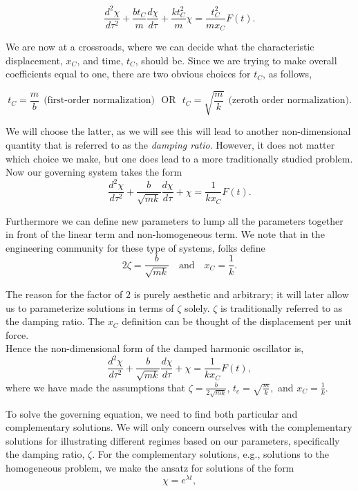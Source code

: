 $$ \frac{d^2 \chi}{d\tau^2} + \frac{b t_C}{m} \frac{d\chi}{d\tau} + \frac{kt_C^2}{m} \chi = \frac{t_C^2}{m x_C} F(t).$$

We are now at a crossroads, where we can decide what the characteristic displacement, $x_C$, and time, $t_C$, should be. Since we are trying to make overall coefficients equal to one, there are two obvious choices for $t_C$, as follows, 

$$t_C = \frac{m}{b} \ \ \mbox{(first-order normalization)} \ \ \ \mbox{OR} \ \ \ t_C = \sqrt{ \frac{m}{k} } \ \ \mbox{(zeroth order normalization)}.$$

We will choose the latter, as we will see this will lead to another non-dimensional quantity that is referred to as the \emph{damping ratio}. However, it does not matter which choice we make, but one does lead to a more traditionally studied problem. Now our governing system takes the form \\

$$ \frac{d^2 \chi}{d\tau^2} + \frac{b}{\sqrt{mk}} \frac{d\chi}{d\tau} + \chi = \frac{1}{k x_C} F(t).$$

Furthermore we can define new parameters to lump all the parameters together in front of the linear term and non-homogeneous term. We note that in the engineering community for these type of systems, folks define \\ 

$$2\zeta = \frac{b}{\sqrt{mk}}\ \ \ \mbox{ and } \ \ \  x_C = \frac{1}{k}.$$

The reason for the factor of $2$ is purely aesthetic and arbitrary; it will later allow us to parameterize solutions in terms of $\zeta$ solely. $\zeta$ is traditionally referred to as the damping ratio. The $x_C$ definition can be thought of the displacement per unit force. \\

Hence the non-dimensional form of the damped harmonic oscillator is, \\

$$ \frac{d^2 \chi}{d\tau^2} + \frac{b}{\sqrt{mk}} \frac{d\chi}{d\tau} + \chi = \frac{1}{k x_C} F(t),$$
%
where we have made the assumptions that $\zeta = \frac{b}{2\sqrt{mk}}$, $t_c  = \sqrt{ \frac{m}{k} },$ and $x_C = \frac{1}{k}.$

To solve the governing equation, we need to find both particular and complementary solutions. We will only concern ourselves with the complementary solutions for illustrating different regimes based on our parameters, specifically the damping ratio, $\zeta.$ For the complementary solutions, e.g., solutions to the homogeneous problem, we make the ansatz for solutions of the form $$\chi = e^{\lambda t},$$

